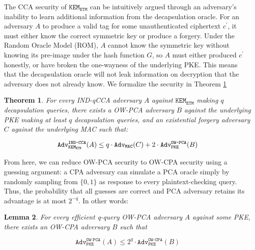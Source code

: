 \documentclass[letterpaper,12pt,titlepage,oneside,final]{book}
\newtheorem{theorem}{Theorem}[section]
\newtheorem{lemma}[theorem]{Lemma}
\newcommand{\pke}{\texttt{PKE}}
\newcommand{\kem}{\texttt{KEM}}
\newcommand{\etm}{{\texttt{ETM}}}  %
\newcommand{\mac}{\texttt{\texttt{MAC}}}
\newcommand{\adv}{\texttt{Adv}}
\begin{document}
The CCA security of $\kem_\etm$ can be intuitively argued through an adversary's inability to learn additional information from the decapsulation oracle. For an adversary $A$ to produce a valid tag for some unauthenticated ciphertext $c^\prime$, it must either know the correct symmetric key or produce a forgery. Under the Random Oracle Model (ROM), $A$ cannot know the symmetric key without knowing its pre-image under the hash function $G$, so $A$ must either produced $c^\prime$ honestly, or have broken the one-wayness of the underlying PKE. This means that the decapsulation oracle will not leak information on decryption that the adversary does not already know. We formalize the security in Theorem \ref{thm:etm-is-ind-qcca-secure}

\begin{theorem}\label{thm:etm-is-ind-qcca-secure}
    For every IND-qCCA adversary $A$ against $\kem_\etm$ making $q$ decapsulation queries, there exists a OW-PCA adversary $B$ against the underlying PKE making at least $q$ decapsulation queries, and an existential forgery adversary $C$ against the underlying MAC such that:

    \begin{equation*}
        \texttt{Adv}^\texttt{IND-CCA}_{\kem_\etm}(A) \leq q \cdot \texttt{Adv}_{\mac}(C) + 2 \cdot \texttt{Adv}^\texttt{OW-PCA}_{\pke}(B)
    \end{equation*}
\end{theorem}

From here, we can reduce OW-PCA security to OW-CPA security using a guessing argument: a CPA adversary can simulate a PCA oracle simply by randomly sampling from $\{0,1\}$ as response to every plaintext-checking query.
Thus, the probability that all guesses are correct and PCA adversary retains its advantage is at most $2^{-q}$. In other words:

\begin{lemma}\label{lem:pca-to-cpa-reduction}
    For every efficient q-query OW-PCA adversary $A$ against some PKE, there exists an OW-CPA adversary $B$ such that

    \begin{equation*}
        \adv_\pke^{\texttt{OW-PCA}}(A) \leq 2^q\cdot \adv_\pke^{\texttt{OW-CPA}}(B)
    \end{equation*}
\end{lemma}
\end{document}

